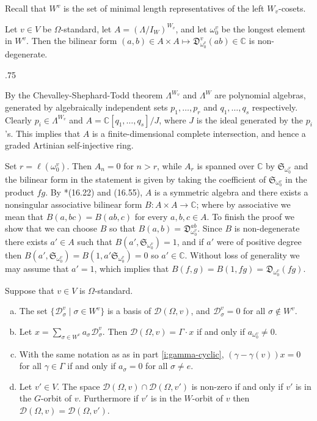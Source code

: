 \documentclass[11pt,fleqn]{amsart}
\makeatletter
\renewcommand\proofname{Proof}
\renewenvironment{proof}[1][\textit{\proofname}]{\par
 \pushQED{\qed}%
 \normalfont \topsep.75\paraskip\relax
 \trivlist
 \item[\hskip\labelsep
 \itshape
 #1\@addpunct{.}]\ignorespaces
}{%
 \popQED\endtrivlist\@endpefalse
}
\newcounter{para}[section]
\newcommand\CC{\mathbb C}
\renewcommand\to{\longrightarrow}
\newcommand\D[3]{{}^{#1} \mathfrak D_{#2}^{#3}}
\newcommand\DD[3]{{}^{#1} \mathcal D_{#2}^{#3}}
\renewcommand\SS{\mathfrak S}
\makeatother
\begin{document}
Recall that $W^v$ is the set of minimal length representatives of the left 
$W_v$-cosets.
\begin{Lemma}
\label{L:speyer-lemma}
Let $v \in V$ be $\Omega$-standard, let $A = (\Lambda / I_W)^{W_v}$, and let
$\omega_0^v$ be the longest element in $W^v$. Then the bilinear form $(a,b) \in A 
\times A \mapsto \D{}{\omega_0^v}{v}(ab) \in \CC$ is non-degenerate.
\end{Lemma}
\begin{proof}
By the Chevalley-Shephard-Todd theorem $\Lambda^{W_v}$ and $\Lambda^W$ are 
polynomial algebras, generated by algebraically independent sets $p_1, \ldots,
p_r$ and $q_1, \ldots, q_s$ respectively. Clearly $p_i \in \Lambda^{W_v}$ and 
$A = \CC[q_1, \ldots, q_s]/ J$, where $J$ is the ideal generated by the 
$p_i$'s. This implies that $A$ is a finite-dimensional complete intersection,
and hence a graded Artinian self-injective ring. 

Set $r = \ell(\omega_0^v)$. Then $A_n = 0$ for $n > r$, while $A_r$ is spanned
over $\CC$ by $\SS_{\omega_0^v}$ and the bilinear form in the statement is 
given by taking the coefficient of $\SS_{\omega_0^v}$ in the product $fg$.
By \cite{Lam-modules-book}*{(16.22) and (16.55)}, $A$ is a symmetric algebra 
and there exists a nonsingular associative bilinear form $B: A \times A 
\to \CC$; where by associative we mean that $B(a,bc) = B(ab,c)$ for every 
$a,b,c \in A$. To finish the proof we show that we can choose $B$ so that $B(a,b) = 
\D{}{\omega_0^v}{ab}$. Since $B$ is non-degenerate there exists $a' \in A$ 
such that $B(a',\SS_{\omega^v_0}) = 1$, and if $a'$ were of positive degree 
then $B(a',\SS_{\omega_0^v}) = B(1, a' \SS_{\omega^v_0}) = 0$ so $a' \in \CC$. 
Without loss of generality we may assume that $a' = 1$, which implies that 
$B(f,g) = B(1,fg) = \D{}{\omega_0^v}{}(fg)$.
\end{proof}
\begin{Proposition}
\label{P:gamma-module-structure}
Suppose that $v \in V$ is $\Omega$-standard. 
\begin{enumerate}[(a)]
\item 
\label{i:gamma-basis}
The set $\{\DD{}{\sigma}{v} \mid \sigma \in W^v\}$ is a basis of 
$\mathcal D(\Omega, v)$, and $\DD{}{\sigma}{v} = 0$ for all $\sigma \notin 
W^v$.

\item 
\label{i:gamma-cyclic}
Let $x = \sum_{\sigma \in W^v} a_\sigma \DD{}{\sigma}{v}$. Then $\mathcal 
D(\Omega, v) = \Gamma \cdot x$ if and only if $a_{\omega_0^v} \neq 0$.

\item
\label{i:gamma-ev-kernel}
With the same notation as as in part \ref{i:gamma-cyclic}, 
$(\gamma - \gamma(v)) x = 0$ for all $\gamma \in \Gamma$ if and only if 
$a_\sigma = 0$ for all $\sigma \neq e$.

\item 
\label{i:gamma-comparision}
Let $v' \in V$. The space $\mathcal D(\Omega, v) \cap \mathcal 
D(\Omega, v')$ is non-zero if and only if $v'$ is in the $G$-orbit of $v$. 
Furthermore if $v'$ is in the $W$-orbit of $v$ then $\mathcal D(\Omega, v) 
= \mathcal D(\Omega, v')$. 
\end{enumerate}
\end{Proposition}
\end{document}

